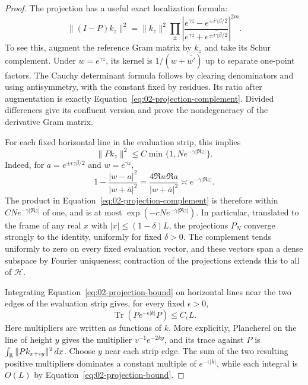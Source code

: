 \begin{proof}
The projection has a useful exact localization formula:
\begin{equation}\label{eq:02-projection-complement}
 \|(I-P)k_z\|^2=\|k_z\|^2
 \prod_{\pm}
 \left|\frac{e^{\gamma z}-e^{\pm i\gamma\beta/2}}
 {e^{\gamma z}+\overline{e^{\pm i\gamma\beta/2}}}\right|^{2m}.
\end{equation}
To see this, augment the reference Gram matrix by $k_z$ and take its
Schur complement. Under $w=e^{\gamma z}$, its kernel is
$1/(w+\overline{w'})$ up to separate one-point factors. The Cauchy
determinant formula follows by clearing denominators and using
antisymmetry, with the constant fixed by residues. Its ratio after
augmentation is exactly Equation~\eqref{eq:02-projection-complement}.
Divided differences give its confluent version and prove the
nondegeneracy of the derivative Gram matrix.

For each fixed horizontal line in the evaluation strip, this implies
\begin{equation}\label{eq:02-projection-bound}
 \|Pk_z\|^2\le C\min\{1,Ne^{-\gamma|\Re z|}\}.
\end{equation}
Indeed, for $a=e^{\pm i\gamma\beta/2}$ and $w=e^{\gamma z}$,
\[
 1-\frac{|w-a|^2}{|w+\overline a|^2}
 =\frac{4\Re w\Re a}{|w+\overline a|^2}
 \asymp e^{-\gamma|\Re z|}.
\]
The product in Equation~\eqref{eq:02-projection-complement} is
therefore within $CNe^{-\gamma|\Re z|}$ of one, and is at most
$\exp(-cNe^{-\gamma|\Re z|})$. In particular, translated to the
frame of any real $x$ with $|x|\le(1-\delta)L$, the projections
$P_N$ converge strongly to the identity, uniformly for fixed
$\delta>0$. The complement tends uniformly to zero on every fixed
evaluation vector, and these vectors span a dense subspace by Fourier
uniqueness; contraction of the projections extends this to all of
$\mathcal H$.

Integrating Equation~\eqref{eq:02-projection-bound} on horizontal
lines near the two edges of the evaluation strip gives, for every
fixed $\epsilon>0$,
\begin{equation}\label{eq:02-trace-envelope}
 \operatorname{Tr}(Pe^{-\epsilon|k|}P)\le C_\epsilon L.
\end{equation}
Here multipliers are written as functions of $k$. More explicitly,
Plancherel on the line of height $y$ gives the multiplier
$v^{-1}e^{-2ky}$, and its trace against $P$ is
$\int_\mathbb R\|Pk_{x+iy}\|^2\,dx$. Choose $y$ near each strip edge.
The sum of the two resulting positive multipliers dominates a
constant multiple of $e^{-\epsilon|k|}$, while each integral is
$O(L)$ by Equation~\eqref{eq:02-projection-bound}.


\end{proof}
